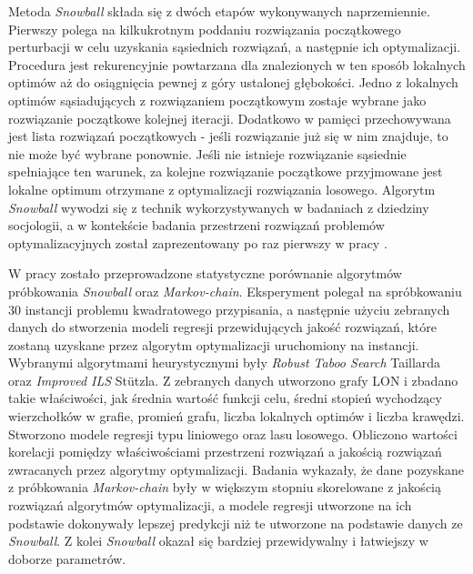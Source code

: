 Metoda \textit{Snowball} składa się z dwóch etapów wykonywanych naprzemiennie. Pierwszy polega na kilkukrotnym poddaniu rozwiązania początkowego perturbacji
w celu uzyskania sąsiednich rozwiązań, a następnie ich optymalizacji. Procedura jest rekurencyjnie powtarzana dla znalezionych w ten sposób lokalnych optimów
aż do osiągnięcia pewnej z góry ustalonej głębokości. Jedno z lokalnych optimów sąsiadujących z rozwiązaniem początkowym zostaje wybrane jako rozwiązanie początkowe kolejnej iteracji.
Dodatkowo w pamięci przechowywana jest lista rozwiązań początkowych - jeśli rozwiązanie już się w nim znajduje, to nie może być wybrane ponownie.
Jeśli nie istnieje rozwiązanie sąsiednie spełniające ten warunek, za kolejne rozwiązanie początkowe przyjmowane jest lokalne optimum otrzymane z optymalizacji rozwiązania losowego.
Algorytm \textit{Snowball} wywodzi się z technik wykorzystywanych w badaniach z dziedziny socjologii, a w kontekście badania przestrzeni rozwiązań
problemów optymalizacyjnych został zaprezentowany po raz pierwszy w pracy \cite{DBLP:conf/ppsn/VerelDOT18}.

W pracy\cite{DBLP:conf/evoW/ThomsonOV19} zostało przeprowadzone statystyczne porównanie algorytmów próbkowania \textit{Snowball}
oraz \textit{Markov-chain}. Eksperyment polegał na spróbkowaniu 30 instancji problemu kwadratowego przypisania, a następnie użyciu zebranych danych
do stworzenia modeli regresji przewidujących jakość rozwiązań, które zostaną uzyskane przez algorytm optymalizacji uruchomiony na instancji.
Wybranymi algorytmami heurystycznymi były \textit{Robust Taboo Search} Taillarda oraz \textit{Improved ILS} Stützla.
Z zebranych danych utworzono grafy LON i zbadano takie właściwości, jak średnia wartość funkcji celu, średni stopień wychodzący
wierzchołków w grafie, promień grafu, liczba lokalnych optimów i liczba krawędzi.
Stworzono modele regresji typu liniowego oraz lasu losowego. Obliczono wartości korelacji pomiędzy właściwościami przestrzeni rozwiązań
a jakością rozwiązań zwracanych przez algorytmy optymalizacji.
Badania wykazały, że dane pozyskane z próbkowania \textit{Markov-chain} były w większym stopniu skorelowane z jakością rozwiązań algorytmów
optymalizacji, a modele regresji utworzone na ich podstawie dokonywały lepszej predykcji niż te utworzone na podstawie danych ze \textit{Snowball}.
Z kolei \textit{Snowball} okazał się bardziej przewidywalny i łatwiejszy w doborze parametrów.

